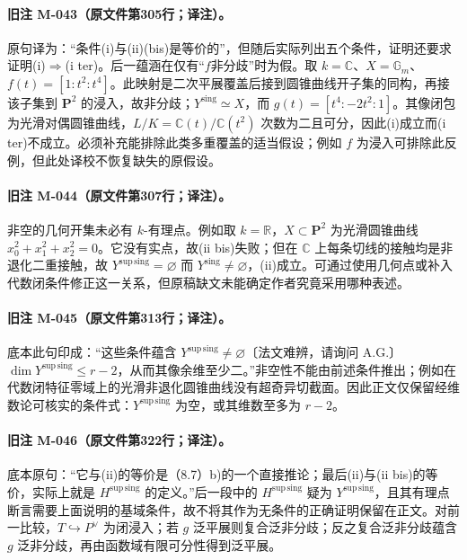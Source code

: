 \paragraph{旧注 M-043（原文件第305行；译注）。}
原句译为：“条件(i)与(ii)(bis)是等价的”，但随后实际列出五个条件，证明还要求证明(i)$\Rightarrow$(i ter)。后一蕴涵在仅有“$f$非分歧”时为假。取 $k=\mathbb C$、$X=\mathbb G_m$、$f(t)=[1:t^2:t^4]$。此映射是二次平展覆盖后接到圆锥曲线开子集的同构，再接该子集到 $\mathbf P^2$ 的浸入，故非分歧；${Y^{\mathrm{sing}}}\simeq X$，而 $g(t)=[t^4:-2t^2:1]$。其像闭包为光滑对偶圆锥曲线，$L/K=\mathbb C(t)/\mathbb C(t^2)$ 次数为二且可分，因此(i)成立而(i ter)不成立。必须补充能排除此类多重覆盖的适当假设；例如 $f$ 为浸入可排除此反例，但此处译校不恢复缺失的原假设。

\paragraph{旧注 M-044（原文件第307行；译注）。}
非空的几何开集未必有 $k$-有理点。例如取 $k=\mathbb R$，$X\subset\mathbf P^2$ 为光滑圆锥曲线 $x_0^2+x_1^2+x_2^2=0$。它没有实点，故(ii bis)失败；但在 $\mathbb C$ 上每条切线的接触均是非退化二重接触，故 ${Y^{\mathrm{sup\,sing}}}=\varnothing$ 而 ${Y^{\mathrm{sing}}}\ne\varnothing$，(ii)成立。可通过使用几何点或补入代数闭条件修正这一关系，但原稿缺文未能确定作者究竟采用哪种表述。

\paragraph{旧注 M-045（原文件第313行；译注）。}
底本此句印成：“这些条件蕴含 ${Y^{\mathrm{sup\,sing}}}\ne\varnothing$〔法文难辨，请询问 A.G.〕$\dim{Y^{\mathrm{sup\,sing}}}\leq r-2$，从而其像余维至少二。”非空性不能由前述条件推出；例如在代数闭特征零域上的光滑非退化圆锥曲线没有超奇异切截面。因此正文仅保留经维数论可核实的条件式：${Y^{\mathrm{sup\,sing}}}$ 为空，或其维数至多为 $r-2$。

\paragraph{旧注 M-046（原文件第322行；译注）。}
底本原句：“它与(ii)的等价是（8.7）b)的一个直接推论；最后(ii)与(ii bis)的等价，实际上就是 $H^{\mathrm{sup\,sing}}$ 的定义。”后一段中的 $H^{\mathrm{sup\,sing}}$ 疑为 $Y^{\mathrm{sup\,sing}}$，且其有理点断言需要上面说明的基域条件，故不将其作为无条件的正确证明保留在正文。对前一比较，$T\hookrightarrow P^\vee$ 为闭浸入；若 $g$ 泛平展则复合泛非分歧；反之复合泛非分歧蕴含 $g$ 泛非分歧，再由函数域有限可分性得到泛平展。

